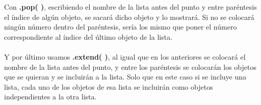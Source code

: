 \documentclass{article}
\begin{document}
	Con \textbf{.pop( )}, escribiendo el nombre de la lista antes del punto y entre paréntesis el índice de algún objeto, se sacará dicho objeto y lo mostrará. Si no se colocará ningún número dentro del paréntesis, sería los mismo que poner el número correspondiente al índice del último objeto de la lista. \\ \\
	Y por último usamos \textbf{.extend( )}, al igual que en los anteriores se colocará el nombre de la lista antes del punto, y entre los paréntesis se colocarán los objetos que se quieran y se incluirán a la lista. Solo que en este caso si se incluye una lista, cada uno de los objetos de esa lista se incluirán como objetos independientes a la otra lista.
	
\end{document}
